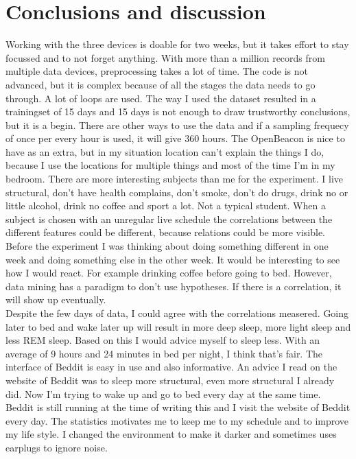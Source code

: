 \section{Conclusions and discussion}
	Working with the three devices is doable for two weeks, but it takes effort to stay focussed and to not forget anything. With more than a million records from multiple data devices, preprocessing takes a lot of time. The code is not advanced, but it is complex because of all the stages the data needs to go through. A lot of loops are used. The way I used the dataset resulted in a trainingset of 15 days and 15 days is not enough to draw trustworthy conclusions, but it is a begin. There are other ways to use the data and if a sampling frequecy of once per every hour is used, it will give 360 hours. The OpenBeacon is nice to have as an extra, but in my situation location can't explain the things I do, because I use the locations for multiple things and most of the time I'm in my bedroom. 
	There are more interesting subjects than me for the experiment. I live structural, don't have health complains, don't smoke, don't do drugs, drink no or little alcohol, drink no coffee and sport a lot. Not a typical student. When a subject is chosen with an unregular live schedule the correlations between the different features could be different, because relations could be more visible. Before the experiment I was thinking about doing something different in one week and doing something else in the other week. It would be interesting to see how I would react. For example drinking coffee before going to bed. However, data mining has a paradigm to don't use hypotheses. If there is a correlation, it will show up eventually.
	\\
	Despite the few days of data, I could agree with the correlations measered. Going later to bed and wake later up will result in more deep sleep, more light sleep and less REM sleep. Based on this I would advice myself to sleep less. With an average of 9 hours and 24 minutes in bed per night, I think that's fair. The interface of Beddit is easy in use and also informative. An advice I read on the website of Beddit was to sleep more structural, even more structural I already did. Now I'm trying to wake up and go to bed every day at the same time. Beddit is still running at the time of writing this and I visit the website of Beddit every day. The statistics motivates me to keep me to my schedule and to improve my life style. I changed the environment to make it darker and sometimes uses earplugs to ignore noise. 
	\\
